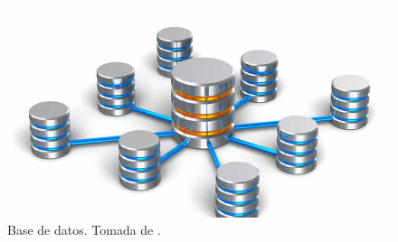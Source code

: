 	\begin{figure}[H]
		\begin{center}
			\includegraphics[scale=0.5]{img/databasepng.png}
		\end{center}
	\caption{Base de datos. Tomada de \cite{googlepics}. \label{databasepng}}
	\end{figure}



